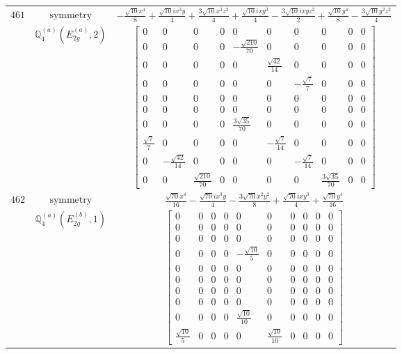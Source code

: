 \documentclass[fleqn,8pt,landscape]{jsarticle}
\begin{document}
\begin{longtable}{ccc}
$ 461 $ & $ \text{symmetry} $ & $ - \frac{\sqrt{10} x^{4}}{8} + \frac{\sqrt{10} i x^{3} y}{4} + \frac{3 \sqrt{10} x^{2} z^{2}}{4} + \frac{\sqrt{10} i x y^{3}}{4} - \frac{3 \sqrt{10} i x y z^{2}}{2} + \frac{\sqrt{10} y^{4}}{8} - \frac{3 \sqrt{10} y^{2} z^{2}}{4} $ \\
$  $ & $ \mathbb{Q}_{4}^{(a)}(E_{2g}^{(a)},2) $ & $ \begin{bmatrix} 0 & 0 & 0 & 0 & 0 & 0 & 0 & 0 & 0 & 0 \\ 0 & 0 & 0 & 0 & - \frac{\sqrt{210}}{70} & 0 & 0 & 0 & 0 & 0 \\ 0 & 0 & 0 & 0 & 0 & \frac{\sqrt{42}}{14} & 0 & 0 & 0 & 0 \\ 0 & 0 & 0 & 0 & 0 & 0 & - \frac{\sqrt{7}}{7} & 0 & 0 & 0 \\ 0 & 0 & 0 & 0 & 0 & 0 & 0 & 0 & 0 & 0 \\ 0 & 0 & 0 & 0 & 0 & 0 & 0 & 0 & 0 & 0 \\ 0 & 0 & 0 & 0 & \frac{3 \sqrt{35}}{70} & 0 & 0 & 0 & 0 & 0 \\ \frac{\sqrt{7}}{7} & 0 & 0 & 0 & 0 & - \frac{\sqrt{7}}{14} & 0 & 0 & 0 & 0 \\ 0 & - \frac{\sqrt{42}}{14} & 0 & 0 & 0 & 0 & - \frac{\sqrt{7}}{14} & 0 & 0 & 0 \\ 0 & 0 & \frac{\sqrt{210}}{70} & 0 & 0 & 0 & 0 & \frac{3 \sqrt{35}}{70} & 0 & 0 \end{bmatrix} $ \\ \hline
$ 462 $ & $ \text{symmetry} $ & $ \frac{\sqrt{70} x^{4}}{16} - \frac{\sqrt{70} i x^{3} y}{4} - \frac{3 \sqrt{70} x^{2} y^{2}}{8} + \frac{\sqrt{70} i x y^{3}}{4} + \frac{\sqrt{70} y^{4}}{16} $ \\
$  $ & $ \mathbb{Q}_{4}^{(a)}(E_{2g}^{(b)},1) $ & $ \begin{bmatrix} 0 & 0 & 0 & 0 & 0 & 0 & 0 & 0 & 0 & 0 \\ 0 & 0 & 0 & 0 & 0 & 0 & 0 & 0 & 0 & 0 \\ 0 & 0 & 0 & 0 & 0 & 0 & 0 & 0 & 0 & 0 \\ 0 & 0 & 0 & 0 & - \frac{\sqrt{10}}{5} & 0 & 0 & 0 & 0 & 0 \\ 0 & 0 & 0 & 0 & 0 & 0 & 0 & 0 & 0 & 0 \\ 0 & 0 & 0 & 0 & 0 & 0 & 0 & 0 & 0 & 0 \\ 0 & 0 & 0 & 0 & 0 & 0 & 0 & 0 & 0 & 0 \\ 0 & 0 & 0 & 0 & 0 & 0 & 0 & 0 & 0 & 0 \\ 0 & 0 & 0 & 0 & \frac{\sqrt{10}}{10} & 0 & 0 & 0 & 0 & 0 \\ \frac{\sqrt{10}}{5} & 0 & 0 & 0 & 0 & \frac{\sqrt{10}}{10} & 0 & 0 & 0 & 0 \end{bmatrix} $ \\ \hline

\end{longtable}
\end{document}
